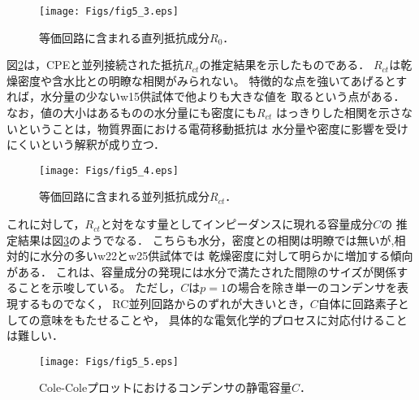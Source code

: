 \begin{figure}[h]
	\begin{center}
	\texttt{[image: Figs/fig5\_3.eps]} 
	\end{center}
	\caption{
		等価回路に含まれる直列抵抗成分$R_0$．
	} 
	\label{fig:fig5_3}
\end{figure}
図\ref{fig:fig5_4}は，CPEと並列接続された抵抗$R_{ct}$の推定結果を示したものである．
$R_{ct}$は乾燥密度や含水比との明瞭な相関がみられない。
特徴的な点を強いてあげるとすれば，水分量の少ないw15供試体で他よりも大きな値を
取るという点がある．なお，値の大小はあるものの水分量にも密度にも$R_{ct}$
はっきりした相関を示さないということは，物質界面における電荷移動抵抗は
水分量や密度に影響を受けにくいという解釈が成り立つ．
\begin{figure}[h]
	\begin{center}
	\texttt{[image: Figs/fig5\_4.eps]} 
	\end{center}
	\caption{
		等価回路に含まれる並列抵抗成分$R_{ct}$．
	} 
	\label{fig:fig5_4}
\end{figure}
これに対して，$R_{ct}$と対をなす量としてインピーダンスに現れる容量成分$C$の
推定結果は図\ref{fig:fig5_5}のようでなる．
こちらも水分，密度との相関は明瞭では無いが,相対的に水分の多いw22とw25供試体では
乾燥密度に対して明らかに増加する傾向がある．
これは、容量成分の発現には水分で満たされた間隙のサイズが関係することを示唆している。
ただし，$C$は$p=1$の場合を除き単一のコンデンサを表現するものでなく，
RC並列回路からのずれが大きいとき，$C$自体に回路素子としての意味をもたせることや，
具体的な電気化学的プロセスに対応付けることは難しい．\\
\begin{figure}[h]
	\begin{center}
	\texttt{[image: Figs/fig5\_5.eps]} 
	\end{center}
	\caption{
		Cole-Coleプロットにおけるコンデンサの静電容量$C$．
	} 
	\label{fig:fig5_5}
\end{figure}

